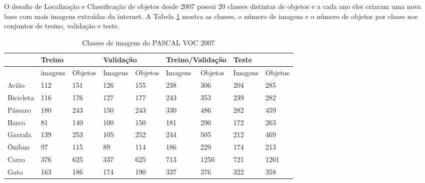 O desafio de Localização e Classificação de objetos desde 2007 possui 20 classes distintas de objetos e a cada ano eles criaram uma nova base com mais imagens extraídas da internet. A Tabela \ref{tab:voc2007} mostra as classes, o número de imagens e o número de objetos por classe nos conjuntos de treino, validação e teste.

\begin{table}[H]
	\centering
	\footnotesize
	\setlength{\abovecaptionskip}{0pt}
	\setlength{\belowcaptionskip}{0pt}
	\caption[Pascal VOC 2007]{Classes de imagens do PASCAL VOC 2007}
	\label{tab:voc2007}
	\begin{tabular}{l|l|l|l|l|l|l|ll}
		& \multicolumn{2}{l|}{Treino} & \multicolumn{2}{l|}{Validação} & \multicolumn{2}{l|}{Treino/Validação} & \multicolumn{2}{l}{Teste}              \\ \hline
		& imagens      & Objetos      & Imagens        & Objetos       & Imagens           & Objetos           & \multicolumn{1}{l|}{Imagens} & Objetos \\ \hline
		Avião          & 112          & 151          & 126            & 155           & 238               & 306               & \multicolumn{1}{l|}{204}     & 285     \\
		Bicicleta      & 116          & 176          & 127            & 177           & 243               & 353               & \multicolumn{1}{l|}{239}     & 282     \\
		Pássaro        & 180          & 243          & 150            & 243           & 330               & 486               & \multicolumn{1}{l|}{282}     & 459     \\
		Barco          & 81           & 140          & 100            & 150           & 181               & 290               & \multicolumn{1}{l|}{172}     & 263     \\
		Garrafa        & 139          & 253          & 105            & 252           & 244               & 505               & \multicolumn{1}{l|}{212}     & 469     \\
		Ônibus         & 97           & 115          & 89             & 114           & 186               & 229               & \multicolumn{1}{l|}{174}     & 213     \\
		Carro          & 376          & 625          & 337            & 625           & 713               & 1250              & \multicolumn{1}{l|}{721}     & 1201    \\
		Gato           & 163          & 186          & 174            & 190           & 337               & 376               & \multicolumn{1}{l|}{322}     & 358     \\

\end{tabular}
\end{table}

